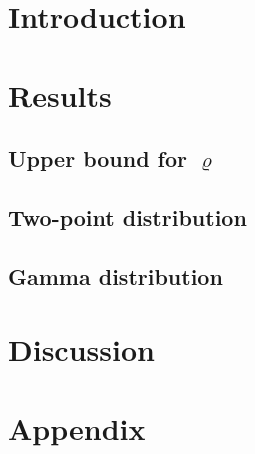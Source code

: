 \documentclass[paper=a4]{scrartcl}
\begin{document}


\section{Introduction}

  

\section{Results}

  

  \subsection*{Upper bound for $\varrho$}

    

  \subsection*{Two-point distribution}  

    

  \subsection*{Gamma distribution}

    

\section{Discussion}

  
    
    \newpage
\clearpage     
\section{Appendix}

  




\printbibliography
  
  
\end{document}
